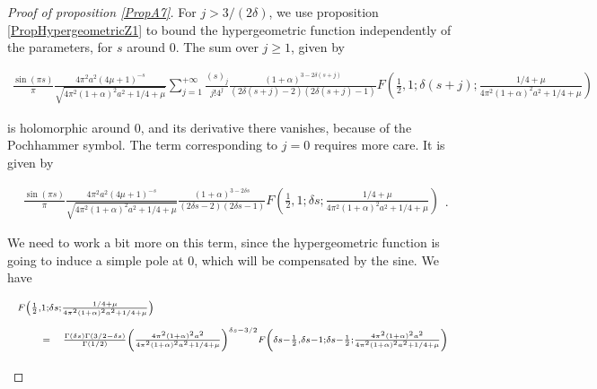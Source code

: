 \documentclass{jams-l}
\theoremstyle{definition}
\theoremstyle{remark}
\numberwithin{equation}{section}
\begin{document}
\begin{proof}[Proof of proposition \ref{PropA7}]
                    \noindent For $j > 3/\left( 2 \delta \right)$, we use proposition \ref{PropHypergeometricZ1} to bound the hypergeometric function independently of the parameters, for $s$ around $0$. The sum over $j \geqslant 1$, given by
                    
                    \[ \begin{array}{l}
                            \scriptstyle \frac{\sin \left( \pi s \right)}{\pi} \frac{4 \pi^2 a^2 \left( 4 \mu + 1 \right)^{-s}}{\sqrt{4 \pi^2 \left( 1 + \alpha \right)^2 a^2 + 1/4 + \mu}} \sum\limits_{j = 1}^{+ \infty} \frac{\left( s \right)_j}{j! 4^j} \frac{\left( 1 + \alpha \right)^{3 - 2 \delta \left( s + j \right)}}{\left( 2 \delta \left( s + j \right) - 2 \right) \left( 2 \delta \left( s + j \right) - 1 \right)} F \left( \frac{1}{2}, 1; \delta \left( s + j \right); \frac{1/4 + \mu}{4 \pi^2 \left( 1 + \alpha \right)^2 a^2 + 1/4 + \mu} \right)
                        \end{array} \]
                    
                    \noindent is holomorphic around $0$, and its derivative there vanishes, because of the Pochhammer symbol. The term corresponding to $j = 0$ requires more care. It is given by
                    
                    \[ \begin{array}{lll}
                            \scriptstyle \frac{\sin \left( \pi s \right)}{\pi} \frac{4 \pi^2 a^2 \left( 4 \mu + 1 \right)^{-s}}{\sqrt{4 \pi^2 \left( 1 + \alpha \right)^2 a^2 + 1/4 + \mu}} \frac{\left( 1 + \alpha \right)^{3 - 2 \delta s}}{\left( 2 \delta s - 2 \right) \left( 2 \delta s - 1 \right)} F \left( \frac{1}{2}, 1; \delta s; \frac{1/4 + \mu}{4 \pi^2 \left( 1 + \alpha \right)^2 a^2 + 1/4 + \mu} \right)
                        \end{array} . \]
                    
                    \noindent We need to work a bit more on this term, since the hypergeometric function is going to induce a simple pole at $0$, which will be compensated by the sine. We have
                    
                    \[ \begin{array}{lll}
                            \multicolumn{3}{l}{\scriptstyle F \left( \frac{1}{2}, 1; \delta s; \frac{1/4 + \mu}{4 \pi^2 \left( 1 + \alpha \right)^2 a^2 + 1/4 + \mu} \right)} \\[1em]
                            
                            \quad & \scriptstyle = & \scriptstyle \frac{\Gamma \left( \delta s \right) \Gamma \left( 3/2 - \delta s \right)}{\Gamma \left( 1/2 \right)} \left( \frac{4 \pi^2 \left( 1 + \alpha \right)^2 a^2}{4 \pi^2 \left( 1 + \alpha \right)^2 a^2 + 1/4 + \mu} \right)^{\delta s - 3/2} F \left( \delta s - \frac{1}{2}, \delta s - 1; \delta s - \frac{1}{2}; \frac{4 \pi^2 \left( 1 + \alpha \right)^2 a^2}{4 \pi^2 \left( 1 + \alpha \right)^2 a^2 + 1/4 + \mu} \right) \\[1em]
                            

\end{array}\]
\end{proof}
\end{document}
